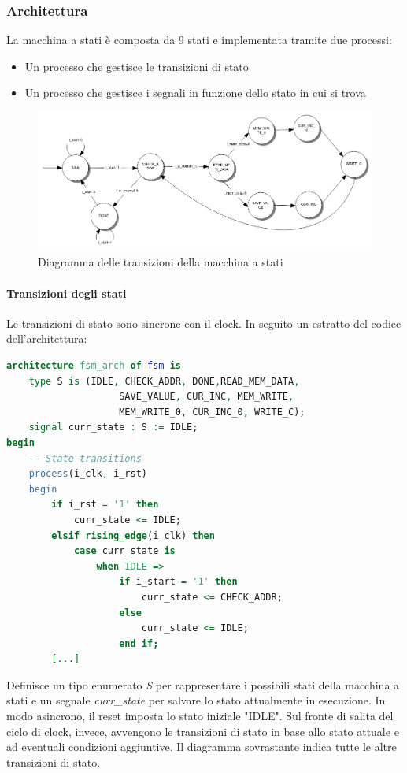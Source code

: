 \documentclass[12pt,a4paper]{scrartcl}
\begin{document}
        \subsubsection{Architettura}
            La macchina a stati è composta da 9 stati e implementata tramite due processi:
            \begin{itemize}
                \item Un processo che gestisce le transizioni di stato
                \item Un processo che gestisce i segnali in funzione dello stato in cui si trova
            \end{itemize}
            \begin{figure}[htbp]
              \centering
              \includegraphics[width=1\linewidth]{fsm.png}
              \caption{Diagramma delle transizioni della macchina a stati}
              \label{fig:componente}
            \end{figure}
            \newpage
            \paragraph{Transizioni degli stati} Le transizioni di stato sono sincrone con il clock. In seguito un estratto del codice dell'architettura:
            \begin{lstlisting}[language=VHDL]
architecture fsm_arch of fsm is
    type S is (IDLE, CHECK_ADDR, DONE,READ_MEM_DATA, 
                    SAVE_VALUE, CUR_INC, MEM_WRITE,
                    MEM_WRITE_0, CUR_INC_0, WRITE_C);
    signal curr_state : S := IDLE;
begin
    -- State transitions
    process(i_clk, i_rst)
    begin
        if i_rst = '1' then
            curr_state <= IDLE;
        elsif rising_edge(i_clk) then
            case curr_state is
                when IDLE => 
                    if i_start = '1' then
                        curr_state <= CHECK_ADDR;
                    else
                        curr_state <= IDLE;
                    end if;
        [...]
            \end{lstlisting}
            Definisce un tipo enumerato \textit{S} per rappresentare i possibili stati della macchina a stati e un segnale \textit{curr\_state} per salvare lo stato attualmente in esecuzione.
            \newline In modo asincrono, il reset imposta lo stato iniziale "IDLE".
            \newline Sul fronte di salita del ciclo di clock, invece, avvengono le transizioni di stato in base allo stato attuale e ad eventuali condizioni aggiuntive.
            \newline Il diagramma sovrastante indica tutte le altre transizioni di stato.
\end{document}
